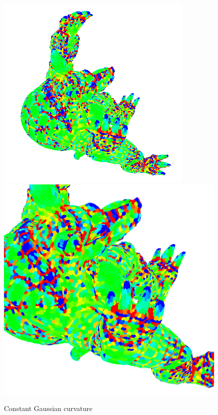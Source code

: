 \begin{figure}[!h]
    \centering
    \centering
    \includegraphics[scale=1.0]{images/gc-armadillo-top.png}
    \endminipage\hfill
    \centering
    \includegraphics[scale=0.4]{images/gc-detail-armadillo-top.png}
    \endminipage
    \caption{Constant Gaussian curvature} \label{fig:gc-detail}
\end{figure}



